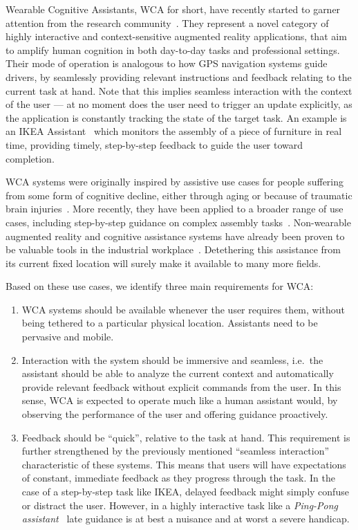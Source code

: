 Wearable Cognitive Assistants, \gls{WCA} for short, have recently started to garner attention from the research community~\cite{ha2014towards,chen2015early}.
They represent a novel category of highly interactive and context-sensitive augmented reality applications, that aim to amplify human cognition in both day-to-day tasks and professional settings.
Their mode of operation is analogous to how \gls{GPS} navigation systems guide drivers, by seamlessly providing relevant instructions and feedback relating to the current task at hand.
Note that this implies seamless interaction with the context of the user --- at no moment does the user need to trigger an update explicitly, as the application is constantly tracking the state of the target task.
An example is an IKEA Assistant~\cite{IKEAAssistant} which monitors the assembly of a piece of furniture in real time, providing timely, step-by-step feedback to guide the user toward completion.

WCA systems were originally inspired by assistive use cases for people suffering from some form of cognitive decline, either through aging or because of traumatic brain injuries~\cite{ha2014towards,satyanarayanan2019augmenting}.
More recently, they have been applied to a broader range of use cases, including step-by-step guidance on complex assembly tasks~\cite{chen2017empirical}.
Non-wearable augmented reality and cognitive assistance systems have already been proven to be valuable tools in the industrial workplace~\cite{funk2015cognitive,gorecky2011cognito}.
Detethering this assistance from its current fixed location will surely make it available to many more fields.

Based on these use cases, we identify three main requirements for \gls{WCA}:\@
\begin{enumerate}
    \item \gls{WCA} systems should be available whenever the user requires them, without being tethered to a particular physical location. Assistants need to be pervasive and mobile.

    \item Interaction with the system should be immersive and seamless, i.e.\ the assistant should be able to analyze the current context and automatically provide relevant feedback without explicit commands from the user.
    In this sense, \gls{WCA} is expected to operate much like a human assistant would, by observing the performance of the user and offering guidance proactively.

    \item Feedback should be ``quick'', relative to the task at hand.
    This requirement is further strengthened by the previously mentioned ``seamless interaction'' characteristic of these systems.
    This means that users will have expectations of constant, immediate feedback as they progress through the task.
    In the case of a step-by-step task like IKEA, delayed feedback might simply confuse or distract the user.
    However, in a highly interactive task like a \emph{Ping-Pong assistant}~\cite{PingPongAssistant,chen2015early} late guidance is at best a nuisance and at worst a severe handicap.
\end{enumerate}

